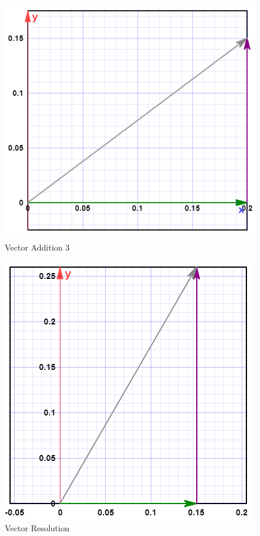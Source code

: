 \documentclass[11pt, titlepage]{article}
\begin{document}
\begin{figure}
\includegraphics[scale=.5, angle=0]{lab03_v3.png}
\caption{Vector Addition 3 \label{fig:v3}}
\end{figure}
\begin{figure}
\includegraphics[scale=.5, angle=0]{lab03_v4.png}
\caption{Vector Resolution \label{fig:v4}}
\end{figure}
\end{document}
